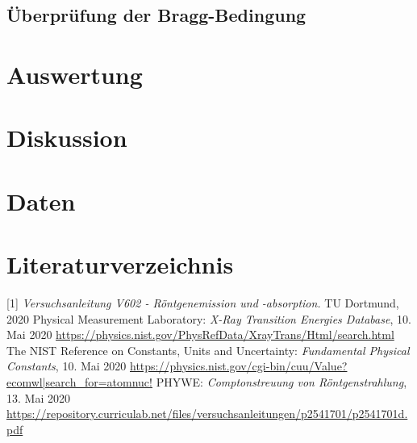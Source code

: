 \documentclass[titlepage = firstcover]{scrartcl}
\begin{document}
      \subsection{Überprüfung der Bragg-Bedingung}
        

    \section{Auswertung}

    \section{Diskussion}
    
    \section{Daten}

    \newpage
    \section{Literaturverzeichnis}
    [1] \textit{Versuchsanleitung V602 - Röntgenemission und -absorption.} TU Dortmund, 2020 \newline
    [2] Physical Measurement Laboratory: \textit{X-Ray Transition Energies Database}, 10. Mai 2020
    \url{https://physics.nist.gov/PhysRefData/XrayTrans/Html/search.html} \newline
    [3] The NIST Reference on Constants, Units and Uncertainty: \textit{Fundamental Physical Constants}, 10. Mai 2020
    \url{https://physics.nist.gov/cgi-bin/cuu/Value?ecomwl|search_for=atomnuc!} \newline
    [4] PHYWE: \textit{Comptonstreuung von Röntgenstrahlung}, 13. Mai 2020
    \url{https://repository.curriculab.net/files/versuchsanleitungen/p2541701/p2541701d.pdf}
\end{document}
